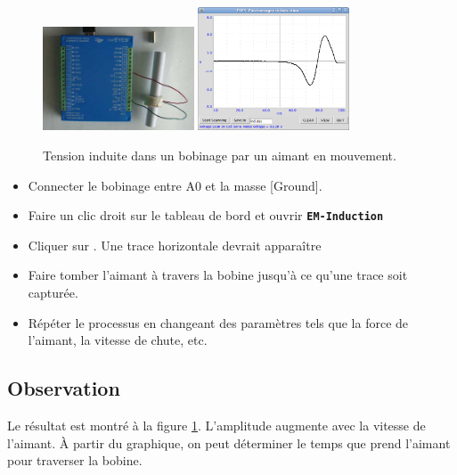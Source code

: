 \documentclass{book}
\newcommand{\nop}{}
\begin{document}
\begin{figure}[h!]
\begin{center}
\caption{\label{fig:EM-Induction}Tension induite dans un bobinage par un aimant en mouvement. }\vspace{0.5em}
\includegraphics[width=0.4\textwidth, height=0.3\textwidth, keepaspectratio]{Schematic-EMinduction-photo.png}
\includegraphics[width=0.4\textwidth, height=0.3\textwidth, keepaspectratio]{Pic-em-induction.png}
\end{center}
\end{figure}



\begin{itemize}
  \item Connecter le bobinage entre A0 et la masse [Ground].
  \item Faire un clic droit sur le tableau de bord et ouvrir  \texttt{\textbf{EM-Induction}\nop}
  \item Cliquer sur  . Une trace horizontale devrait apparaître
  \item Faire tomber l'aimant à travers la bobine jusqu'à ce qu'une trace soit capturée.
  \item Répéter le processus en changeant des paramètres tels que la force de l'aimant, la vitesse de chute, etc.
\end{itemize}

\subsection{Observation}


Le résultat est montré à la figure  \ref{fig:EM-Induction}. L'amplitude augmente avec la vitesse de l'aimant. À partir du graphique, on peut déterminer le temps que prend l'aimant pour traverser la bobine.
\end{document}
